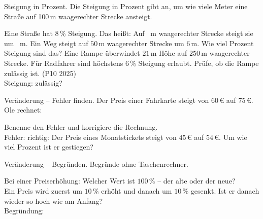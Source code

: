 \begin{aufgabe}{Steigung in Prozent. Die Steigung in Prozent gibt an, um wie viele Meter eine Straße auf 100\,m waagerechter Strecke ansteigt.}
\begin{teile}
\teil Eine Straße hat $8\,\%$ Steigung. Das heißt: Auf \leerfeld\ m waagerechter Strecke steigt sie um \leerfeld\ m.
\teil Ein Weg steigt auf $50\,$m waagerechter Strecke um $6\,$m. Wie viel Prozent Steigung sind das? \leerfeld[\%]
\teil Eine Rampe überwindet $21\,$m Höhe auf $250\,$m waagerechter Strecke. Für Radfahrer sind höchstens $6\,\%$ Steigung erlaubt. Prüfe, ob die Rampe zulässig ist. \hfill (P10 2025) \\ Steigung: \leerfeld[\%] \quad zulässig? \janein
\end{teile}
\end{aufgabe}

\begin{aufgabe}{Veränderung – Fehler finden. Der Preis einer Fahrkarte steigt von $60\,€$ auf $75\,€$. Ole rechnet:}
\begin{teile}
\teil Benenne den Fehler und korrigiere die Rechnung. \\ Fehler: \dsleer\dsleer\dsleer \quad richtig: \leerfeld[\%]
\teil Der Preis eines Monatstickets steigt von $45\,€$ auf $54\,€$. Um wie viel Prozent ist er gestiegen? \leerfeld[\%]
\end{teile}
\end{aufgabe}

\begin{aufgabe}{Veränderung – Begründen. Begründe ohne Taschenrechner.}
\begin{teile}
\teil Bei einer Preiserhöhung: Welcher Wert ist $100\,\%$ – der alte oder der neue? \\ \dsleer\dsleer\dsleer\dsleer
\teil Ein Preis wird zuerst um $10\,\%$ erhöht und danach um $10\,\%$ gesenkt. Ist er danach wieder so hoch wie am Anfang? \janein \\ Begründung: \dsleer\dsleer\dsleer\dsleer
\end{teile}
\end{aufgabe}
